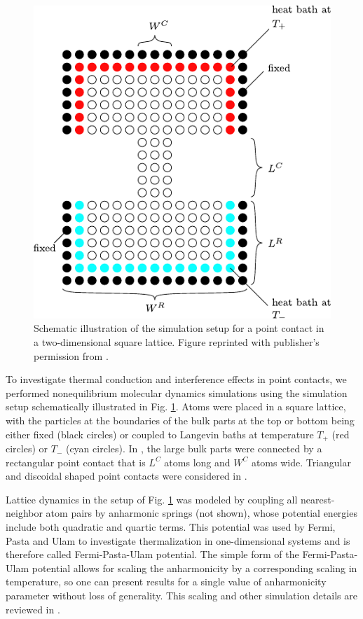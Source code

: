 \begin{figure}
\begin{center}
 \includegraphics[width=.85\columnwidth]{pics/fpu_fig1_mod.pdf}
 \caption{Schematic illustration of the simulation setup for a point contact in a two-dimensional square lattice. Figure reprinted with publisher's permission from .}
\label{fig:fpu_fig1}
\end{center}
\end{figure}

To investigate thermal conduction and interference effects in point contacts, we performed nonequilibrium molecular dynamics simulations using the simulation setup schematically illustrated in Fig. \ref{fig:fpu_fig1}. Atoms were placed in a square lattice, with the particles at the boundaries of the bulk parts at the top or bottom being either fixed (black circles) or coupled to Langevin baths at temperature $T_+$ (red circles) or $T_-$ (cyan circles). In , the large bulk parts were connected by a rectangular point contact that is $L^C$ atoms long and $W^C$ atoms wide. Triangular and discoidal shaped point contacts were considered in . 

Lattice dynamics in the setup of Fig. \ref{fig:fpu_fig1} was modeled by coupling all nearest-neighbor atom pairs by anharmonic springs (not shown), whose potential energies include both quadratic and quartic terms. This potential was used by Fermi, Pasta and Ulam to investigate thermalization in one-dimensional systems \cite{fermi55} and is therefore called Fermi-Pasta-Ulam potential. The simple form of the Fermi-Pasta-Ulam potential allows for scaling the anharmonicity by a corresponding scaling in temperature, so one can present results for a single value of anharmonicity parameter without loss of generality. This scaling and other simulation details are reviewed in . 


